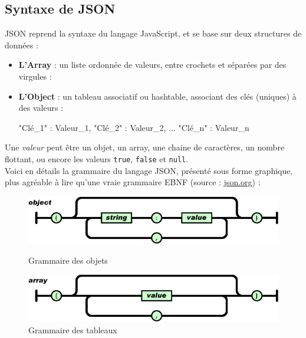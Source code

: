 \documentclass[a4paper,11pt]{article}
\begin{document}
\subsection{Syntaxe de JSON}
JSON reprend la syntaxe du langage JavaScript, et se base sur deux structures de données : 
\begin{itemize}
	\item \textbf{L'Array} : un liste ordonnée de valeurs, entre crochets et séparées par des virgules :
		\begin{verbatimtab}
		\end{verbatimtab}
	\item \textbf{L'Object} : un tableau associatif ou hashtable, associant des clés (uniques) à des valeurs :
		\begin{verbatimtab}[4]

		{ "Clé_1" : Valeur_1,
		  "Clé_2" : Valeur_2,
		  ...
		  "Clé_n" : Valeur_n}
		\end{verbatimtab}
\end{itemize}

Une \emph{valeur} peut être un objet, un array, une chaine de caractères, un nombre flottant, ou encore les valeurs \texttt{true}, \texttt{false} et \texttt{null}.\\
Voici en détails la grammaire du langage JSON, présenté sous forme graphique, plus agréable à lire qu'une vraie grammaire EBNF (source : \url{json.org}) : 

\vspace{1\baselineskip}

\begin{figure}[H]
	\includegraphics[width=15cm]{gramm_object} \\
	\caption{Grammaire des objets}
\end{figure}

\begin{figure}[H]
\includegraphics[width=15cm]{gramm_array}
	\caption{Grammaire des tableaux}
\end{figure}
\end{document}
